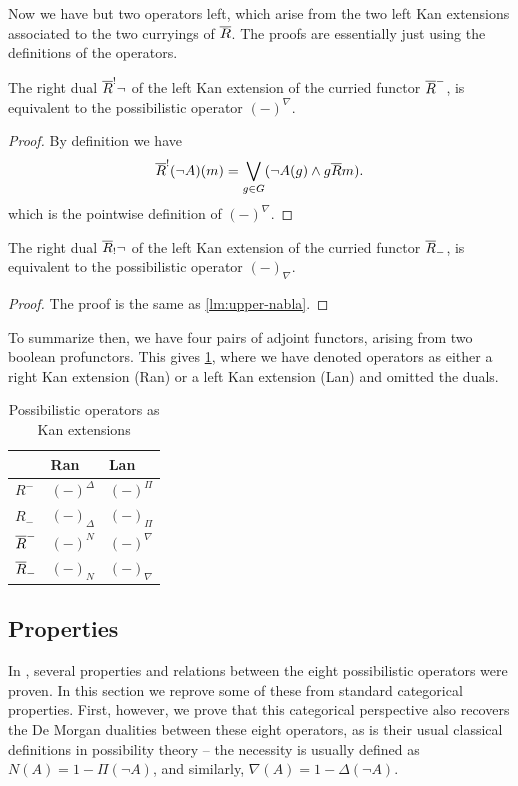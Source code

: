 Now we have but two operators left, which arise from the two left Kan extensions associated to the two curryings of $\overline{R}$. The proofs are essentially just using the definitions of the operators. 

\begin{lemma}
    \label{lm:upper-nabla}
    The right dual $\overline{R}^!\neg$ of the left Kan extension of the curried functor $\overline{R}^-$, is equivalent to the possibilistic operator $(-)^\nabla$.
\end{lemma}
\begin{proof}
    By definition we have 
    \[\overline{R}^!(\neg A)(m)=\bigvee_{g\in G} (\neg A(g)\wedge g\overline{R} m).\]
    which is the pointwise definition of $(-)^\nabla$.   
\end{proof}

\begin{lemma}
    \label{lm:lower-nabla}
    The right dual $\overline{R}_!\neg$ of the left Kan extension of the curried functor $\overline{R}_-$, is equivalent to the possibilistic operator $(-)_\nabla$.
\end{lemma}
\begin{proof}
    The proof is the same as \cref{lm:upper-nabla}. 
\end{proof}

To summarize then, we have four pairs of adjoint functors, arising from two boolean profunctors. This gives \cref{tab:lan-ran}, where we have denoted operators as either a right Kan extension (Ran) or a left Kan extension (Lan) and omitted the duals. 

\begin{table}[ht]
\centering
\begin{tabular}{l|ll}
& Ran & Lan\\
\hline
$R^-$   & $(-)^\Delta$ & $(-)^\Pi$ \\
$R_-$   & $(-)_\Delta$ & $(-)_\Pi$  \\
$\overline{R}^-$ & $(-)^N$      &  $(-)^\nabla$ \\
$\overline{R}_-$ & $(-)_N$    & $(-)_\nabla$
\end{tabular}
\caption{Possibilistic operators as Kan extensions}
\label{tab:lan-ran}
\end{table}



\subsection{Properties}

In \cite{djouadi_prade_2011}, several properties and relations between the eight possibilistic operators were proven. In this section we reprove some of these from standard categorical properties. First, however, we prove that this categorical perspective also recovers the De Morgan dualities between these eight operators, as is their usual classical definitions in possibility theory -- the necessity is usually defined as $N(A) = 1-\Pi(\neg A)$, and similarly, $\nabla(A)=1-\Delta(\neg A)$. 


